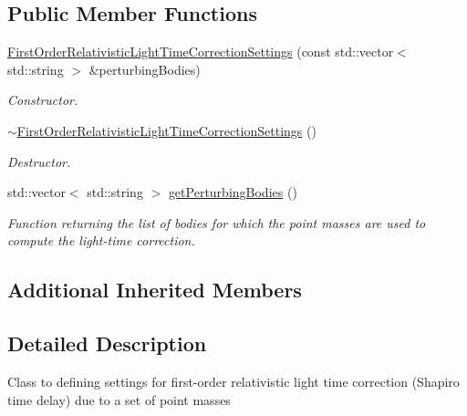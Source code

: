 \subsection*{Public Member Functions}
\begin{DoxyCompactItemize}
\item 
\hyperlink{classtudat_1_1observation__models_1_1FirstOrderRelativisticLightTimeCorrectionSettings_ac7a1d72c3d7eb9b69630531447015166}{First\+Order\+Relativistic\+Light\+Time\+Correction\+Settings} (const std\+::vector$<$ std\+::string $>$ \&perturbing\+Bodies)
\begin{DoxyCompactList}\small\item\em Constructor. \end{DoxyCompactList}\item 
\hyperlink{classtudat_1_1observation__models_1_1FirstOrderRelativisticLightTimeCorrectionSettings_ac9e3fa9e97730907190ab96399dd18bb}{$\sim$\+First\+Order\+Relativistic\+Light\+Time\+Correction\+Settings} ()\hypertarget{classtudat_1_1observation__models_1_1FirstOrderRelativisticLightTimeCorrectionSettings_ac9e3fa9e97730907190ab96399dd18bb}{}\label{classtudat_1_1observation__models_1_1FirstOrderRelativisticLightTimeCorrectionSettings_ac9e3fa9e97730907190ab96399dd18bb}

\begin{DoxyCompactList}\small\item\em Destructor. \end{DoxyCompactList}\item 
std\+::vector$<$ std\+::string $>$ \hyperlink{classtudat_1_1observation__models_1_1FirstOrderRelativisticLightTimeCorrectionSettings_ac5f1130c1ad18cb187a1ec30d55cd533}{get\+Perturbing\+Bodies} ()
\begin{DoxyCompactList}\small\item\em Function returning the list of bodies for which the point masses are used to compute the light-\/time correction. \end{DoxyCompactList}\end{DoxyCompactItemize}
\subsection*{Additional Inherited Members}


\subsection{Detailed Description}
Class to defining settings for first-\/order relativistic light time correction (Shapiro time delay) due to a set of point masses 

